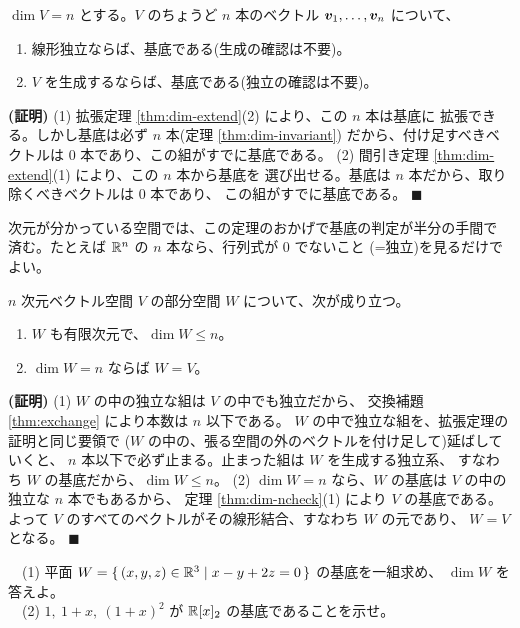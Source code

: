 \begin{teiri}[$n$ 次元空間での基底判定]\label{thm:dim-ncheck}
$\dim V = n$ とする。$V$ のちょうど $n$ 本のベクトル
$\bm{v}_1, \dots, \bm{v}_n$ について、
\begin{enumerate}
\item 線形独立ならば、基底である(生成の確認は不要)。
\item $V$ を生成するならば、基底である(独立の確認は不要)。
\end{enumerate}
\end{teiri}

\noindent\textbf{(証明)}\quad
(1) 拡張定理 \ref{thm:dim-extend}(2) により、この $n$ 本は基底に
拡張できる。しかし基底は必ず $n$ 本(定理 \ref{thm:dim-invariant})
だから、付け足すべきベクトルは $0$ 本であり、この組がすでに基底である。
(2) 間引き定理 \ref{thm:dim-extend}(1) により、この $n$ 本から基底を
選び出せる。基底は $n$ 本だから、取り除くべきベクトルは $0$ 本であり、
この組がすでに基底である。 $\blacksquare$

次元が分かっている空間では、この定理のおかげで基底の判定が半分の手間で
済む。たとえば $\mathbb{R}^n$ の $n$ 本なら、行列式が $0$ でないこと
(=独立)を見るだけでよい。

\begin{teiri}[部分空間の次元]\label{thm:dim-sub}
$n$ 次元ベクトル空間 $V$ の部分空間 $W$ について、次が成り立つ。
\begin{enumerate}
\item $W$ も有限次元で、$\dim W \le n$。
\item $\dim W = n$ ならば $W = V$。
\end{enumerate}
\end{teiri}

\noindent\textbf{(証明)}\quad
(1) $W$ の中の独立な組は $V$ の中でも独立だから、
交換補題 \ref{thm:exchange} により本数は $n$ 以下である。
$W$ の中で独立な組を、拡張定理の証明と同じ要領で
($W$ の中の、張る空間の外のベクトルを付け足して)延ばしていくと、
$n$ 本以下で必ず止まる。止まった組は $W$ を生成する独立系、
すなわち $W$ の基底だから、$\dim W \le n$。
(2) $\dim W = n$ なら、$W$ の基底は $V$ の中の独立な $n$ 本でもあるから、
定理 \ref{thm:dim-ncheck}(1) により $V$ の基底である。よって
$V$ のすべてのベクトルがその線形結合、すなわち $W$ の元であり、
$W = V$ となる。 $\blacksquare$

\begin{mondai}\label{q:basis1}
　(1) 平面 $W = \{\,(x, y, z) \in \mathbb{R}^3 \mid x - y + 2z = 0\,\}$ の基底を一組求め、
$\dim W$ を答えよ。\\
　(2) $1,\ 1 + x,\ (1 + x)^2$ が $\mathbb{R}[x]_2$ の基底であることを示せ。
\end{mondai}

